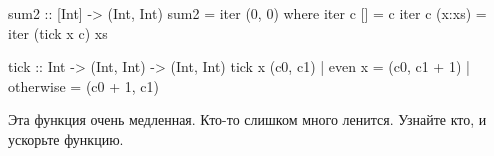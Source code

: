 \begin{itemize}
\begin{code}
sum2 :: [Int] -> (Int, Int)
sum2 = iter (0, 0)
    where iter c  []     = c
          iter c  (x:xs) = iter (tick x c) xs

tick :: Int -> (Int, Int) -> (Int, Int)
tick x (c0, c1) | even x    = (c0, c1 + 1)
                | otherwise = (c0 + 1, c1)
\end{code} 

    Эта функция очень медленная. Кто-то слишком много ленится.
    Узнайте кто, и ускорьте функцию.
   
\end{itemize}
